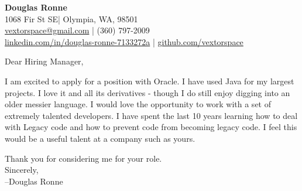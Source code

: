 \documentclass[letter,12pt]{article}
\begin{document}
\begin{center}
    {\Huge \textbf{Douglas Ronne}}\\
    \vspace{2mm}
    1068 Fir St SE| Olympia, WA, 98501\\
    \href{mailto:vextorspace@gmail.com}{vextorspace@gmail.com} | (360) 797-2009\\
    \href{www.linkedin.com/in/douglas-ronne-7133272a}{linkedin.com/in/douglas-ronne-7133272a} | \href{https://github.com/vextorspace}{github.com/vextorspace}
\end{center}

Dear Hiring Manager,

I am excited to apply for a position with Oracle. I have used Java for my largest projects. I love it and all its derivatives - though I do still enjoy digging into an older messier language. I would love the opportunity to work with a set of extremely talented developers. I have spent the last 10 years learning how to deal with Legacy code and how to prevent code from becoming legacy code. I feel this would be a useful talent at a company such as yours.


Thank you for considering me for your role.
\\
Sincerely,\\
--Douglas Ronne
\end{document}
